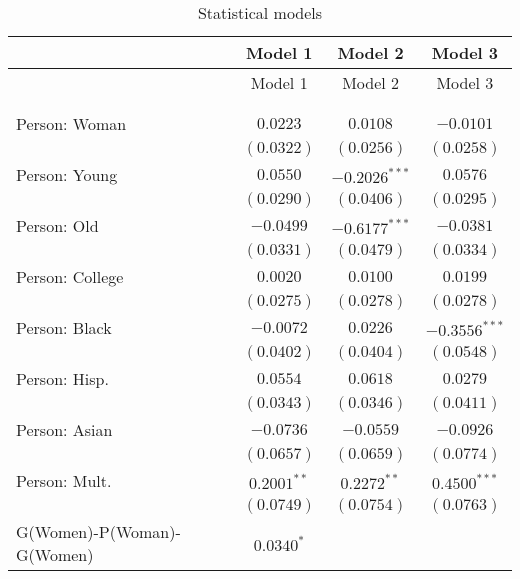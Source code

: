 
\begin{center}
\begin{longtable}{l c c c}
\toprule
 & Model 1 & Model 2 & Model 3 \\
\midrule
\endfirsthead
\toprule
 & Model 1 & Model 2 & Model 3 \\
\midrule
\endhead
\bottomrule
\endfoot
\bottomrule
\multicolumn{4}{l}{\scriptsize{$^{***}p<0.001$; $^{**}p<0.01$; $^{*}p<0.05$}}\\
\caption{Statistical models}
\label{table:coefficients}
\endlastfoot \\
Person: Woman              & $0.0223$       & $0.0108$        & $-0.0101$       \\
                           & $(0.0322)$     & $(0.0256)$      & $(0.0258)$      \\
Person: Young              & $0.0550$       & $-0.2026^{***}$ & $0.0576$        \\
                           & $(0.0290)$     & $(0.0406)$      & $(0.0295)$      \\
Person: Old                & $-0.0499$      & $-0.6177^{***}$ & $-0.0381$       \\
                           & $(0.0331)$     & $(0.0479)$      & $(0.0334)$      \\
Person: College            & $0.0020$       & $0.0100$        & $0.0199$        \\
                           & $(0.0275)$     & $(0.0278)$      & $(0.0278)$      \\
Person: Black              & $-0.0072$      & $0.0226$        & $-0.3556^{***}$ \\
                           & $(0.0402)$     & $(0.0404)$      & $(0.0548)$      \\
Person: Hisp.              & $0.0554$       & $0.0618$        & $0.0279$        \\
                           & $(0.0343)$     & $(0.0346)$      & $(0.0411)$      \\
Person: Asian              & $-0.0736$      & $-0.0559$       & $-0.0926$       \\
                           & $(0.0657)$     & $(0.0659)$      & $(0.0774)$      \\
Person: Mult.              & $0.2001^{**}$  & $0.2272^{**}$   & $0.4500^{***}$  \\
                           & $(0.0749)$     & $(0.0754)$      & $(0.0763)$      \\
G(Women)-P(Woman)-G(Women) & $0.0340^{*}$   &                 &                 \\

\end{longtable}
\end{center}
